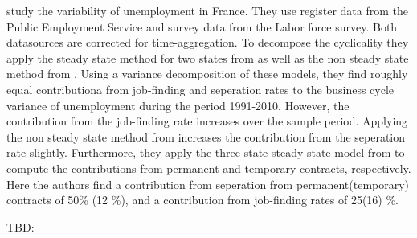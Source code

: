 \cite{Hairault2015}	study the variability of unemployment in France. They use register data from the Public Employment Service and survey data from the Labor force survey. Both datasources are corrected for time-aggregation. To decompose the cyclicality they apply the steady state method for two states from \cite{Shimer2012} as well as the non steady state method from \cite{Elsby2013}. Using a variance decomposition of these models, they find roughly equal contributiona from job-finding and seperation rates to the business cycle variance of unemployment during the period 1991-2010. However, the contribution from the job-finding rate increases over the sample period. Applying the non steady state method from \cite{Elsby2013} increases the contribution from the seperation rate slightly. Furthermore, they apply the three state steady state model from \cite{Shimer2012} to compute the contributions from permanent and temporary contracts, respectively. Here the authors find a contribution from seperation from permanent(temporary) contracts of 50\% (12 \%), and a contribution from job-finding rates of 25(16) \%. 

TBD: \cite{Yashiv2007}